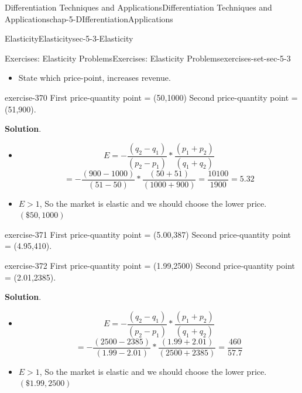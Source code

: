 \documentclass[oneside,10pt,]{book}
\numberwithin{equation}{section}
\newcommand{\gt}{>}
\begin{document}
\begin{chapterptx}{Differentiation Techniques and Applications}{}{Differentiation Techniques and Applications}{}{}{chap-5-DIfferentiationApplications}
\begin{sectionptx}{Elasticity}{}{Elasticity}{}{}{sec-5-3-Elasticity}
\begin{exercises-subsection-numberless}{Exercises: Elasticity Problems}{}{Exercises: Elasticity Problems}{}{}{exercises-set-sec-5-3}
\begin{itemize}[label=\textbullet]
Find the elasticity for the given pair of points.%
\item{}\hypertarget{p-2080}{}%
State which price-point, increases revenue.%
\end{itemize}
\begin{divisionexercise}{7}{}{}{exercise-370}%
\hypertarget{p-2081}{}%
First price-quantity point = (\textdollar{}50,1000) Second price-quantity point = (\textdollar{}51,900).%
\par\smallskip%
\noindent\textbf{Solution}.\hypertarget{solution-186}{}\quad%
\leavevmode%
\begin{itemize}[label=\textbullet]
\item{}%
\begin{equation*}
E=-\frac{(q_2-q_1 )}{(p_2-p_1 )}
*\frac{(p_1+p_2 )}{(q_1+q_2 )}
\end{equation*}
%
\begin{equation*}
=-\frac{(900-1000)}{(51-50)}*\frac{(50+51)}{(1000+900)}
=\frac{10100}{1900}=5.32
\end{equation*}
%
\item{}\hypertarget{p-2082}{}%
\(E\gt 1\), So the market is elastic and we should choose the lower price. \((\$50, 1000)\)%
\end{itemize}
\end{divisionexercise}%
\begin{divisionexercise}{8}{}{}{exercise-371}%
\hypertarget{p-2083}{}%
First price-quantity point = (\textdollar{}5.00,387) Second price-quantity point = (\textdollar{}4.95,410).%
\end{divisionexercise}%
\begin{divisionexercise}{9}{}{}{exercise-372}%
\hypertarget{p-2084}{}%
First price-quantity point = (\textdollar{}1.99,2500) Second price-quantity point = (\textdollar{}2.01,2385).%
\par\smallskip%
\noindent\textbf{Solution}.\hypertarget{solution-187}{}\quad%
\leavevmode%
\begin{itemize}[label=\textbullet]
\item{}%
\begin{equation*}
E=-\frac{(q_2-q_1 )}{(p_2-p_1 )}
*\frac{(p_1+p_2 )}{(q_1+q_2 )}
\end{equation*}
%
\begin{equation*}
=-\frac{(2500-2385)}{(1.99-2.01)}*\frac{(1.99+2.01)}{(2500+2385)}
=\frac{460}{57.7}
\end{equation*}
%
\item{}\hypertarget{p-2085}{}%
\(E\gt 1\), So the market is elastic and we should choose the lower price. \((\$1.99, 2500)\)%

\end{itemize}
\end{divisionexercise}
\end{exercises-subsection-numberless}
\end{sectionptx}
\end{chapterptx}
\end{document}
